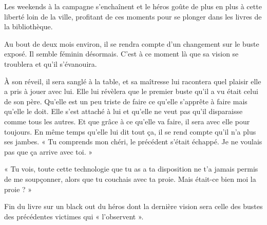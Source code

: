 Les weekends à la campagne s'enchaînent et le héros goûte de plus en plus à
cette liberté loin de la ville, profitant de ces moments pour se plonger dans
les livres de la bibliothèque.

Au bout de deux mois environ, il se rendra compte d'un changement sur le buste
exposé. Il semble féminin désormais. C'est à ce moment là que sa vision se
troublera et qu'il s'évanouira.

À son réveil, il sera sanglé à la table, et sa maîtresse lui racontera quel
plaisir elle a pris à jouer avec lui. Elle lui révèlera que le premier buste
qu'il a vu était celui de son père. Qu'elle est un peu triste de faire ce
qu'elle s'apprête à faire mais qu'elle le doit. Elle s'est attaché à lui et
qu'elle ne veut pas qu'il disparaisse comme tous les autres. Et que grâce à ce
qu'elle va faire, il sera avec elle pour toujours. En même temps qu'elle lui
dit tout ça, il se rend compte qu'il n'a plus ses jambes. « Tu comprends mon
chéri, le précédent s'était échappé. Je ne voulais pas que ça arrive avec toi. »

« Tu vois, toute cette technologie que tu as a ta disposition ne t'a jamais
permis de me soupçonner, alors que tu couchais avec ta proie. Mais était-ce
bien moi la proie ? »

Fin du livre sur un black out du héros dont la dernière vision sera celle des
bustes des précédentes victimes qui « l'observent ».